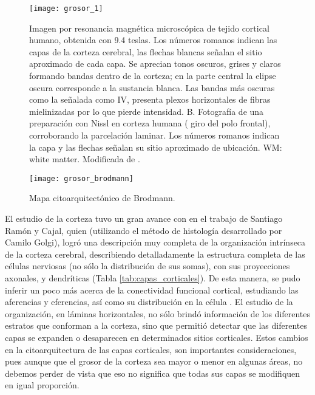 \begin{figure}[htb]
\begin{figg}
   \texttt{[image: grosor\_1]}
   \caption{Imagen por resonancia magnética microscópica de tejido cortical humano, obtenida con 9.4 teslas. Los números romanos indican las capas de la corteza cerebral, las flechas blancas señalan el sitio aproximado de cada capa. Se aprecian tonos oscuros, grises y claros formando bandas dentro de la corteza; en la parte central la elipse oscura corresponde a la sustancia blanca. Las bandas más oscuras como la señalada como IV, presenta plexos horizontales de fibras mielinizadas por lo que pierde intensidad. B. Fotografía de una preparación con Nissl en corteza humana ( giro del polo frontal), corroborando la parcelación laminar. Los números romanos indican la capa y las flechas señalan su sitio aproximado de ubicación. WM: white matter. Modificada de \cite{Fatterpekar2002}. }
 \label{fig:grosor_1}
 \end{figg}
\end{figure}



\begin{figure}[htb]
\begin{figg}
   \texttt{[image: grosor\_brodmann]}
   \caption{Mapa citoarquitectónico de Brodmann.}
 \label{fig:grosor_brodmann}
 \end{figg}
\end{figure}


El estudio de la corteza tuvo un gran avance con en el trabajo de Santiago Ramón y Cajal, quien (utilizando el método de histología desarrollado por Camilo Golgi), logró una descripción muy completa
de la organización intrínseca de la corteza cerebral, describiendo detalladamente la estructura completa
de las células nerviosas (no sólo la distribución de sus somas), con sus proyecciones axonales, y
dendríticas (Tabla \ref{tab:capas_corticales}). De esta manera, se pudo inferir un poco más acerca de la conectividad funcional cortical, estudiando las aferencias y eferencias, así como su distribución en la célula \cite{brodal_1981,fulton_1949}. El estudio de la organización, en láminas horizontales, no sólo brindó información de los diferentes estratos que conforman a la corteza, sino que permitió detectar que las diferentes capas se expanden o desaparecen en determinados sitios corticales. Estos cambios en la citoarquitectura de las capas corticales, son importantes consideraciones, pues aunque que el grosor de la corteza sea mayor o menor en algunas áreas, no debemos perder de vista que eso no significa que todas sus capas se modifiquen en igual proporción.


